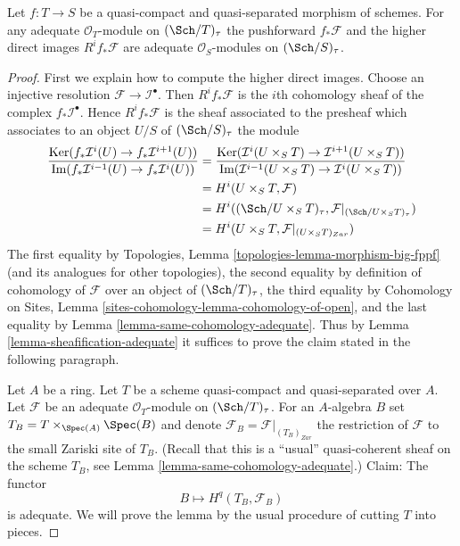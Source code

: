 \begin{lemma}
\label{lemma-direct-image-adequate}
Let $f : T \to S$ be a quasi-compact and quasi-separated morphism
of schemes. For any adequate $\mathcal{O}_T$-module on
$(\Sch/T)_\tau$ the pushforward
$f_*\mathcal{F}$ and the higher direct images $R^if_*\mathcal{F}$
are adequate $\mathcal{O}_S$-modules on $(\Sch/S)_\tau$.
\end{lemma}

\begin{proof}
First we explain how to compute the higher direct images.
Choose an injective resolution $\mathcal{F} \to \mathcal{I}^\bullet$.
Then $R^if_*\mathcal{F}$ is the $i$th cohomology sheaf of the
complex $f_*\mathcal{I}^\bullet$.
Hence $R^if_*\mathcal{F}$ is the sheaf associated to the presheaf
which associates to an object $U/S$ of $(\Sch/S)_\tau$
the module
\begin{align*}
\frac{\text{Ker}(f_*\mathcal{I}^i(U) \to f_*\mathcal{I}^{i + 1}(U))}
{\text{Im}(f_*\mathcal{I}^{i - 1}(U) \to f_*\mathcal{I}^i(U))}
& =
\frac{\text{Ker}(\mathcal{I}^i(U \times_S T) \to
\mathcal{I}^{i + 1}(U \times_S T))}
{\text{Im}(\mathcal{I}^{i - 1}(U \times_S T) \to \mathcal{I}^i(U \times_S T))}
\\
& =
H^i(U \times_S T, \mathcal{F}) \\
& = H^i((\Sch/U \times_S T)_\tau,
\mathcal{F}|_{(\Sch/U \times_S T)_\tau}) \\
& = H^i(U \times_S T, \mathcal{F}|_{(U \times_S T)_{Zar}})
\end{align*}
The first equality by
Topologies, Lemma \ref{topologies-lemma-morphism-big-fppf}
(and its analogues for other topologies),
the second equality by definition of cohomology of $\mathcal{F}$
over an object of $(\Sch/T)_\tau$,
the third equality by
Cohomology on Sites, Lemma \ref{sites-cohomology-lemma-cohomology-of-open},
and the last equality by
Lemma \ref{lemma-same-cohomology-adequate}.
Thus by
Lemma \ref{lemma-sheafification-adequate}
it suffices to prove the claim stated in the following paragraph.

\medskip\noindent
Let $A$ be a ring. Let $T$ be a scheme quasi-compact and quasi-separated
over $A$. Let $\mathcal{F}$ be an adequate $\mathcal{O}_T$-module on
$(\Sch/T)_\tau$. For an $A$-algebra $B$ set
$T_B = T \times_{\Spec(A)} \Spec(B)$ and denote
$\mathcal{F}_B = \mathcal{F}|_{(T_B)_{Zar}}$ the restriction of
$\mathcal{F}$ to the small Zariski site of $T_B$.
(Recall that this is a ``usual'' quasi-coherent sheaf on the scheme
$T_B$, see
Lemma \ref{lemma-same-cohomology-adequate}.)
Claim: The functor
$$
B \longmapsto H^q(T_B, \mathcal{F}_B)
$$
is adequate. We will prove the lemma by the usual
procedure of cutting $T$ into pieces.


\end{proof}
